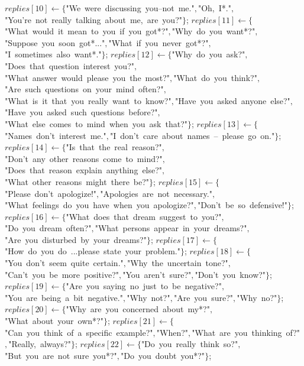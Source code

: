 \documentclass[a4paper,10pt]{article}
\begin{document}
\begin{algorithm}
\begin{algorithmic}[5]
  \State \(replies[10]\gets\{\)"{}We\ were\ discussing\ you--not\ me."{}\(,\)"{}Oh,\ I*."{}\(,\)"{}You'{}re\ not\ really\ talking\ about\ me,\ are\ you?"{}\(\}\);
  \State \(replies[11]\gets\{\)"{}What\ would\ it\ mean\ to\ you\ if\ you\ got*?"{}\(,\)"{}Why\ do\ you\ want*?"{}\(,\)"{}Suppose\ you\ soon\ got*..."{}\(,\)"{}What\ if\ you\ never\ got*?"{}\(,\)"{}I\ sometimes\ also\ want*."{}\(\}\);
  \State \(replies[12]\gets\{\)"{}Why\ do\ you\ ask?"{}\(,\)"{}Does\ that\ question\ interest\ you?"{}\(,\)"{}What\ answer\ would\ please\ you\ the\ most?"{}\(,\)"{}What\ do\ you\ think?"{}\(,\)"{}Are\ such\ questions\ on\ your\ mind\ often?"{}\(,\)"{}What\ is\ it\ that\ you\ really\ want\ to\ know?"{}\(,\)"{}Have\ you\ asked\ anyone\ else?"{}\(,\)"{}Have\ you\ asked\ such\ questions\ before?"{}\(,\)"{}What\ else\ comes\ to\ mind\ when\ you\ ask\ that?"{}\(\}\);
  \State \(replies[13]\gets\{\)"{}Names\ don'{}t\ interest\ me."{}\(,\)"{}I\ don'{}t\ care\ about\ names\ --\ please\ go\ on."{}\(\}\);
  \State \(replies[14]\gets\{\)"{}Is\ that\ the\ real\ reason?"{}\(,\)"{}Don'{}t\ any\ other\ reasons\ come\ to\ mind?"{}\(,\)"{}Does\ that\ reason\ explain\ anything\ else?"{}\(,\)"{}What\ other\ reasons\ might\ there\ be?"{}\(\}\);
  \State \(replies[15]\gets\{\)"{}Please\ don'{}t\ apologize!"{}\(,\)"{}Apologies\ are\ not\ necessary."{}\(,\)"{}What\ feelings\ do\ you\ have\ when\ you\ apologize?"{}\(,\)"{}Don'{}t\ be\ so\ defensive!"{}\(\}\);
  \State \(replies[16]\gets\{\)"{}What\ does\ that\ dream\ suggest\ to\ you?"{}\(,\)"{}Do\ you\ dream\ often?"{}\(,\)"{}What\ persons\ appear\ in\ your\ dreams?"{}\(,\)"{}Are\ you\ disturbed\ by\ your\ dreams?"{}\(\}\);
  \State \(replies[17]\gets\{\)"{}How\ do\ you\ do\ ...please\ state\ your\ problem."{}\(\}\);
  \State \(replies[18]\gets\{\)"{}You\ don'{}t\ seem\ quite\ certain."{}\(,\)"{}Why\ the\ uncertain\ tone?"{}\(,\)"{}Can'{}t\ you\ be\ more\ positive?"{}\(,\)"{}You\ aren'{}t\ sure?"{}\(,\)"{}Don'{}t\ you\ know?"{}\(\}\);
  \State \(replies[19]\gets\{\)"{}Are\ you\ saying\ no\ just\ to\ be\ negative?"{}\(,\)"{}You\ are\ being\ a\ bit\ negative."{}\(,\)"{}Why\ not?"{}\(,\)"{}Are\ you\ sure?"{}\(,\)"{}Why\ no?"{}\(\}\);
  \State \(replies[20]\gets\{\)"{}Why\ are\ you\ concerned\ about\ my*?"{}\(,\)"{}What\ about\ your\ own*?"{}\(\}\);
  \State \(replies[21]\gets\{\)"{}Can\ you\ think\ of\ a\ specific\ example?"{}\(,\)"{}When?"{}\(,\)"{}What\ are\ you\ thinking\ of?"{}\(,\)"{}Really,\ always?"{}\(\}\);
  \State \(replies[22]\gets\{\)"{}Do\ you\ really\ think\ so?"{}\(,\)"{}But\ you\ are\ not\ sure\ you*?"{}\(,\)"{}Do\ you\ doubt\ you*?"{}\(\}\);

\end{algorithmic}
\end{algorithm}
\end{document}
